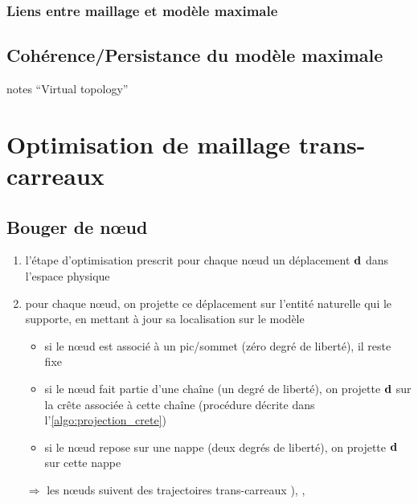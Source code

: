 \subsubsection{Liens entre maillage et modèle maximale}



\subsection{Cohérence/Persistance du modèle maximale}
\cf notes ``Virtual topology''









\section{Optimisation de maillage trans-carreaux}

\subsection{Bouger de n\oe ud}
\label{section:projection_surface_composite}
\begin{enumerate}
	\item l'étape d'optimisation prescrit pour chaque n\oe ud un déplacement $\mathbf{d}$ dans l'espace physique
	\item pour chaque n\oe ud, on projette ce déplacement sur l'entité naturelle qui le supporte, en mettant à jour sa localisation sur le modèle \brep
	\begin{itemize}
		\item si le n\oe ud est associé à un pic/sommet (zéro degré de liberté), il reste fixe 
		\item si le n\oe ud fait partie d'une chaîne (un degré de liberté), on projette $\mathbf{d}$ sur la crête associée à cette chaîne (procédure décrite dans l'\autoref{algo:projection_crete})
		\item si le n\oe ud repose sur une nappe (deux degrés de liberté), on projette $\mathbf{d}$ sur cette nappe
	\end{itemize}
	\item[$\Rightarrow$] les n\oe uds suivent des trajectoires trans-carreaux \cite[Section~5.5]{foucault2008}), \cite{thompson2005}, \cite[p.42 et Section~4.4.1]{crozet2017}
\end{enumerate}

